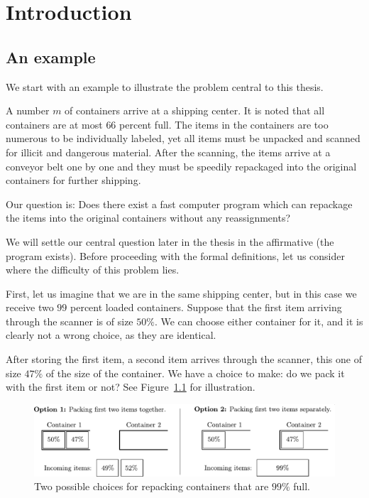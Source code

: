 \chapter{Introduction}\label{chap:intro}

\section{An example}\label{sec:example}

We start with an example to illustrate the problem central to this thesis.

A number $m$ of containers arrive at a shipping center. It is noted
that all containers are at most $66$ percent full. The items in the
containers are too numerous to be individually labeled, yet all items
must be unpacked and scanned for illicit and dangerous material. After
the scanning, the items arrive at a conveyor belt one by one and they must
be speedily repackaged into the original containers for further shipping.

Our question is: Does there exist a fast computer program which can
repackage the items into the original containers without any
reassignments?

We will settle our central question later in the thesis in the
affirmative (the program exists). Before proceeding with the formal
definitions, let us consider where the difficulty of this problem
lies.

First, let us imagine that we are in the same shipping center, but in
this case we receive two $99$ percent loaded containers. Suppose that
the first item arriving through the scanner is of size $50\%$. We can
choose either container for it, and it is clearly not a wrong choice,
as they are identical.

After storing the first item, a second item arrives through the
scanner, this one of size $47\%$ of the size of the container. We have
a choice to make: do we pack it with the first item or not? See
Figure~\ref{fig:ninetynine} for illustration.

\begin{figure}[th]
\begin{center}
\includegraphics[width=\textwidth]{img/ninetynine.pdf}
\end{center}
\caption{Two possible choices for repacking containers that are $99\%$ full.}
\label{fig:ninetynine}
\end{figure}


